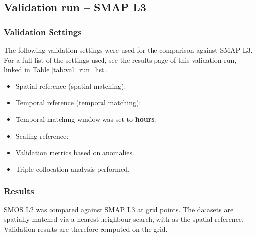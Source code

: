 \subsection{Validation run  -- SMAP L3}


\subsubsection{Validation Settings}

The following validation settings were used for the comparison against \ac{SMAP} \ac{L3}.
For a full list of the settings used, see the results page of this validation run, linked in Table \ref{tab:val_run_list}.

\begin{itemize}
    \item Spatial reference (spatial matching): \textbf{}
    \item Temporal reference (temporal matching): \textbf{}
    \item Temporal matching window was set to \textbf{ hours}.
    \item Scaling reference: \textbf{}
    \item Validation metrics  based on anomalies.
    \item Triple collocation analysis  performed.
\end{itemize}

\subsubsection{Results}

\noindent \ac{SMOS} \ac{L2} was compared against \ac{SMAP} \ac{L3} at  grid points.
The datasets are spatially matched via a nearest-neighbour search, with  as the spatial reference.
Validation results are therefore computed on the  grid.

